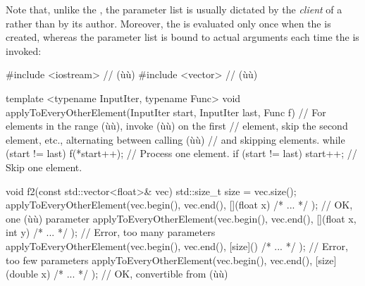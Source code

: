 Note that, unlike the , the parameter list is
usually dictated by the \emph{client} of a 
rather than by its author. Moreover, the  is
evaluated only once when the  is created, whereas the
parameter list is bound to actual arguments each time the  is invoked:

\begin{emcppslisting}[emcppserrorlines={22,24}]
#include <iostream>  // (ù{}ù)
#include <vector>    // (ù{}ù)

template <typename InputIter, typename Func>
void applyToEveryOtherElement(InputIter start, InputIter last, Func f) 
    // For elements in the range (ù{\codeincomments{[start, last)}}ù), invoke (ù{}ù) on the first
    // element, skip the second element, etc., alternating between calling (ù{}ù)
    // and skipping elements.
{
    while (start != last)
    {
        f(*start++);                     // Process one element.
        if (start != last) { start++; }  // Skip one element.
    }
}

void f2(const std::vector<float>& vec)
{
    std::size_t size = vec.size();
    applyToEveryOtherElement(vec.begin(), vec.end(),
                [](float x){ /* ... */ });         // OK, one (ù{}ù) parameter
    applyToEveryOtherElement(vec.begin(), vec.end(),
                [](float x, int y){ /* ... */ });  // Error, too many parameters
    applyToEveryOtherElement(vec.begin(), vec.end(),
                [size](){ /* ... */ });            // Error, too few parameters
    applyToEveryOtherElement(vec.begin(), vec.end(),
                [size](double x){ /* ... */ });    // OK, convertible from (ù{}ù)
}
\end{emcppslisting}
    

